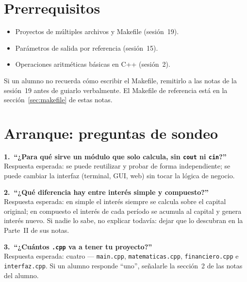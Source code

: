 \documentclass[12pt, oneside]{article}
\begin{document}
\section{Prerrequisitos}

\begin{itemize}
  \item Proyectos de múltiples archivos y Makefile (sesión~19).
  \item Parámetros de salida por referencia (sesión~15).
  \item Operaciones aritméticas básicas en C++ (sesión~2).
\end{itemize}

\begin{notaprofesor}
  Si un alumno no recuerda cómo escribir el Makefile, remitirlo a las
  notas de la sesión~19 antes de guiarlo verbalmente.  El Makefile de
  referencia está en la sección~\ref{sec:makefile} de estas notas.
\end{notaprofesor}

\section{Arranque: preguntas de sondeo}

\begin{notaprofesor}
  \textbf{1.\ ``¿Para qué sirve un módulo que solo calcula, sin
  \texttt{cout} ni \texttt{cin}?''}\\
  Respuesta esperada: se puede reutilizar y probar de forma independiente;
  se puede cambiar la interfaz (terminal, GUI, web) sin tocar la lógica
  de negocio.

  \medskip
  \textbf{2.\ ``¿Qué diferencia hay entre interés simple y compuesto?''}\\
  Respuesta esperada: en simple el interés siempre se calcula sobre el
  capital original; en compuesto el interés de cada período se acumula
  al capital y genera interés nuevo.  Si nadie lo sabe, no explicar
  todavía: dejar que lo descubran en la Parte~II de sus notas.

  \medskip
  \textbf{3.\ ``¿Cuántos \texttt{.cpp} va a tener tu proyecto?''}\\
  Respuesta esperada: cuatro — \texttt{main.cpp}, \texttt{matematicas.cpp},
  \texttt{financiero.cpp} e \texttt{interfaz.cpp}.  Si un alumno responde
  ``uno'', señalarle la sección~2 de las notas del alumno.
\end{notaprofesor}
\end{document}
